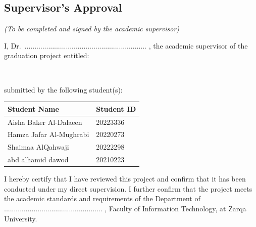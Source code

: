 \begin{english}
    

\thispagestyle{empty}

\section*{\centering Supervisor's Approval}
\begin{center}
{\itshape (To be completed and signed by the academic supervisor)}
\end{center}

I, Dr.\ .............................................................. , the academic supervisor of the graduation project  
entitled:

\vspace{0.5cm}

\begin{center}
\begin{minipage}{0.9\textwidth}
\centering
\underline{\hspace{15cm}} \\[0.3cm]
\underline{\hspace{15cm}}
\end{minipage}
\end{center}

\vspace{0.5cm}

submitted by the following student(s):

\vspace{0.3cm}

\begin{center}
\begin{tabular}{|p{8cm}|p{4.5cm}|}
\hline
\textbf{Student Name} & \textbf{Student ID} \\
\hline
Aisha Baker Al-Dalaeen &  20223336\\ \hline
Hamza Jafar Al-Mughrabi &20220273  \\ \hline
Shaimaa AlQahwaji& 20222298 \\ \hline
abd alhamid dawod& 20210223\\ \hline

\end{tabular}
\end{center}

\vspace{0.7cm}

I hereby certify that I have reviewed this project and confirm that it has been conducted under my  
direct supervision. I further confirm that the project meets the academic standards and  
requirements of the Department of .................................................. , Faculty of  
Information Technology, at Zarqa University.


\end{english}
